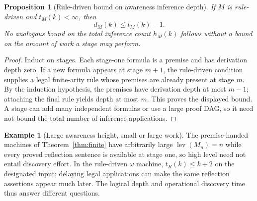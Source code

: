 \documentclass[11pt,letterpaper]{article}
\newtheorem{proposition}[theorem]{Proposition}
\theoremstyle{definition}\newtheorem{definition}[theorem]{Definition}\newtheorem{example}[theorem]{Example}\newtheorem{protocol}[theorem]{Protocol}\newtheorem{question}[theorem]{Open Problem}
\theoremstyle{remark}\newtheorem{remark}[theorem]{Remark}
\newcommand{\lev}{\operatorname{lev}}
\begin{document}
\begin{proposition}[Rule-driven bound on awareness inference depth]\label{prop:lower}
If $M$ is rule-driven and $t_M(k)<\infty$, then
\[
d_M(k)\le t_M(k)-1.
\]
No analogous bound on the \emph{total} inference count $h_M(k)$ follows without a bound on the amount of work a stage may perform.
\end{proposition}
\begin{proof}
Induct on stages. Each stage-one formula is a premise and has derivation depth zero. If a new formula appears at stage $m+1$, the rule-driven condition supplies a legal finite-arity rule whose premises are already present at stage $m$. By the induction hypothesis, the premises have derivation depth at most $m-1$; attaching the final rule yields depth at most $m$. This proves the displayed bound. A stage can add many independent formulas or use a large proof DAG, so it need not bound the total number of inference applications.
\end{proof}
\begin{example}[Large awareness height, small or large work]
The premise-handed machines of Theorem~\ref{thm:finite} have arbitrarily large $\lev(M_n)=n$ while every proved reflection sentence is available at stage one, so high level need not entail discovery effort. In the rule-driven $\omega$ machine, $t_R(k)\le k+2$ on the designated input; delaying legal applications can make the same reflection assertions appear much later. The logical depth and operational discovery time thus answer different questions.
\end{example}
\end{document}
